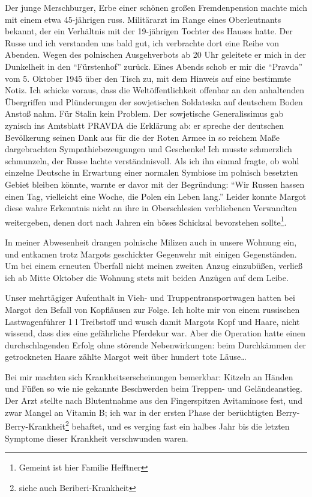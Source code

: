 \documentclass[a5paper,pagesize,10pt,twoside=true]{scrbook}
\renewcommand{\marginpar}[2][]{}
\begin{document}
Der junge Merschburger, Erbe einer schönen großen Fremdenpension machte mich mit einem etwa 45-jährigen russ. Militärarzt im Range eines Oberleutnants bekannt, der ein Verhältnis mit der 19-jährigen Tochter des Hauses hatte. Der Russe und ich verstanden uns bald gut, ich verbrachte dort eine Reihe von Abenden. Wegen des polnischen Ausgehverbots ab 20 Uhr geleitete er mich in der Dunkelheit in den \enquote{Fürstenhof} zurück. Eines Abends schob er mir die \enquote{Pravda} vom 5. Oktober 1945 über den Tisch zu, mit dem Hinweis auf eine bestimmte Notiz. Ich schicke voraus, dass die Weltöffentlichkeit offenbar an den anhaltenden Übergriffen und Plünderungen der sowjetischen Soldateska auf deutschem Boden Anstoß nahm. Für Stalin kein Problem. Der sowjetische Generalissimus gab zynisch ins Amtsblatt PRAVDA die Erklärung ab: er spreche der deutschen Bevölkerung \marginpar{116} seinen Dank aus für die der Roten Armee in so reichem Maße dargebrachten Sympathiebezeugungen und Geschenke! Ich musste schmerzlich schmunzeln, der Russe lachte verständnisvoll. Als ich ihn einmal fragte, ob wohl einzelne Deutsche in Erwartung einer normalen Symbiose im polnisch besetzten Gebiet bleiben könnte, warnte er davor mit der Begründung: \enquote{Wir Russen hassen einen Tag, vielleicht eine Woche, die Polen ein Leben lang.} Leider konnte Margot diese wahre Erkenntnis nicht an ihre in Oberschlesien verbliebenen Verwandten weitergeben, denen dort nach Jahren ein böses Schicksal bevorstehen sollte\footnote{Gemeint ist hier Familie Hefftner}.

In meiner Abwesenheit drangen polnische Milizen auch in unsere Wohnung ein, und entkamen trotz Margots geschickter Gegenwehr mit einigen Gegenständen. Um bei einem erneuten Überfall nicht meinen zweiten Anzug einzubüßen, verließ ich ab Mitte Oktober die Wohnung stets mit beiden Anzügen auf dem Leibe.

Unser mehrtägiger Aufenthalt in Vieh- und Truppentransportwagen hatten bei Margot den Befall von Kopfläusen zur Folge. Ich holte mir von einem russischen Lastwagenführer 1 l Treibstoff und wusch damit Margots Kopf und Haare, nicht wissend, dass dies eine gefährliche Pferdekur war. Aber die Operation hatte einen durchschlagenden Erfolg ohne störende Nebenwirkungen: beim Durchkämmen der getrockneten Haare zählte Margot weit über hundert tote Läuse\dots

Bei mir machten sich Krankheitserscheinungen bemerkbar: Kitzeln an Händen \marginpar{117} und Füßen so wie nie gekannte Beschwerden beim Treppen- und Geländeanstieg. Der Arzt stellte nach Blutentnahme aus den Fingerspitzen Avitaminose fest, und zwar Mangel an Vitamin B; ich war in der ersten Phase der berüchtigten Berry-Berry-Krankheit\footnote{siehe auch Beriberi-Krankheit} behaftet, und es verging fast ein halbes Jahr bis die letzten Symptome dieser Krankheit verschwunden waren.
\end{document}
